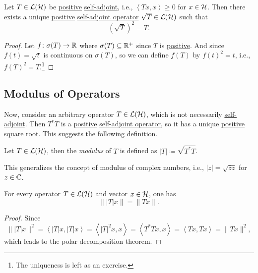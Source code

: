 \begin{proposition}\label{prop:square-root-of-op}
	Let \(T\in \mathcal{\MakeUppercase{l}} (\mathcal{\MakeUppercase{h}} )\) be \hyperref[def:positive-op]{positive} \hyperref[def:self-adjoint-op]{self-adjoint}, i.e., \(\left\langle Tx, x \right\rangle \geq 0\) for \(x\in \mathcal{\MakeUppercase{h}} \). Then there exists a unique \hyperref[def:positive-op]{positive} \hyperref[def:self-adjoint-op]{self-adjoint operator} \(\sqrt{T} \in \mathcal{\MakeUppercase{l}} (\mathcal{\MakeUppercase{h}} )\) such that
	\[
		(\sqrt{T} )^{2} = T.
	\]
\end{proposition}
\begin{proof}
	Let \(f\colon \sigma(T) \to \mathbb{\MakeUppercase{r}} \) where \(\sigma (T) \subseteq \mathbb{\MakeUppercase{r}} ^+\) since \(T\) is \hyperref[def:positive-op]{positive}. And since \(f(t) = \sqrt{t} \) is continuous on \(\sigma (T)\), so we can define \(f(T)\) by \(f(t)^2 = t\), i.e., \(f(T)^2 = T\).\footnote{The uniqueness is left as an exercise.}
\end{proof}


\subsection{Modulus of Operators}
Now, consider an arbitrary operator \(T\in \mathcal{\MakeUppercase{l}} (\mathcal{\MakeUppercase{h}} )\), which is not necessarily \hyperref[def:self-adjoint-op]{self-adjoint}. Then \(T^{\ast} T\) is a \hyperref[def:positive-op]{positive} \hyperref[def:self-adjoint-op]{self-adjoint operator}, so it has a unique \hyperref[def:positive-op]{positive} square root. This suggests the following definition.

\begin{definition}[Modulus]\label{def:modulus}
	Let \(T\in \mathcal{\MakeUppercase{l}} (\mathcal{\MakeUppercase{h}} )\), then the \emph{modulus} of \(T\) is defined as \(\vert T \vert \coloneqq \sqrt{T^{\ast} T} \).
\end{definition}

This generalizes the concept of modulus of complex numbers, i.e., \(\vert z \vert = \sqrt{\overline{z} z} \) for \(z\in \mathbb{\MakeUppercase{c}} \).

\begin{lemma}\label{lma:lec24}
	For every operator \(T\in \mathcal{\MakeUppercase{l}} (\mathcal{\MakeUppercase{h}} )\) and vector \(x\in \mathcal{\MakeUppercase{h}} \), one has
	\[
		\lVert \vert T \vert x \rVert = \lVert Tx \rVert.
	\]
\end{lemma}
\begin{proof}
	Since
	\[
		\lVert \vert T \vert x \rVert ^2
		= \left\langle \vert T \vert x, \vert T \vert x \right\rangle
		= \left\langle \vert T \vert ^2 x, x \right\rangle
		= \left\langle T^{\ast} Tx, x \right\rangle
		= \left\langle Tx, Tx \right\rangle
		= \lVert Tx \rVert ^2,
	\]
	which leads to the polar decomposition theorem.
\end{proof}

